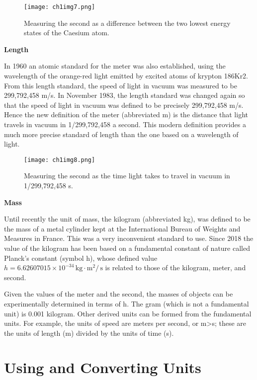 \begin{figure}[htbp]
	\centering
	\texttt{[image: ch1img7.png]}
	\caption{Measuring the second as a difference between the two lowest energy states of the Caesium atom.}
	\end{figure}

\medskip

\textbf{Length}

In 1960 an atomic standard for the meter was also established, using the wavelength of the orange-red light emitted by excited atoms of krypton 186Kr2. From this length standard, the speed of light in vacuum was measured to be 299,792,458 m/s. In November 1983, the length standard was changed again so that the speed of light in vacuum was defined to be precisely 299,792,458 m/s. Hence the new definition of the meter (abbreviated m) is the distance that light travels in vacuum in 1/299,792,458 a second. This modern definition provides a much more precise standard of length than the one based on a wavelength of light.

\begin{figure}[htbp]
  \centering
  \texttt{[image: ch1img8.png]}
  \caption{Measuring the second as the time light takes to travel in vacuum in 1/299,792,458 s.}
  \label{fig:ch1img8}
\end{figure}

\textbf{Mass}

Until recently the unit of mass, the kilogram (abbreviated kg), was defined to be the mass of a metal cylinder kept at the International Bureau of Weights and Measures in France. This was a very inconvenient standard to use. Since 2018 the value of the kilogram has been based on a fundamental constant of nature called Planck’s constant (symbol h), whose defined value $h = 6.62607015 \times 10^{-34}\, \text{kg}\cdot\text{m}^{2}/ \, \text{s}$ is related to those of the kilogram, meter, and second.
 
Given the values of the meter and the second, the masses of objects can be experimentally determined in terms of h. The gram (which is not a fundamental unit) is 0.001 kilogram. Other derived units can be formed from the fundamental units. For example, the units of speed are meters per second, or m>s; these are the units of length (m) divided by the units of time (s).

\section{Using and Converting Units}

